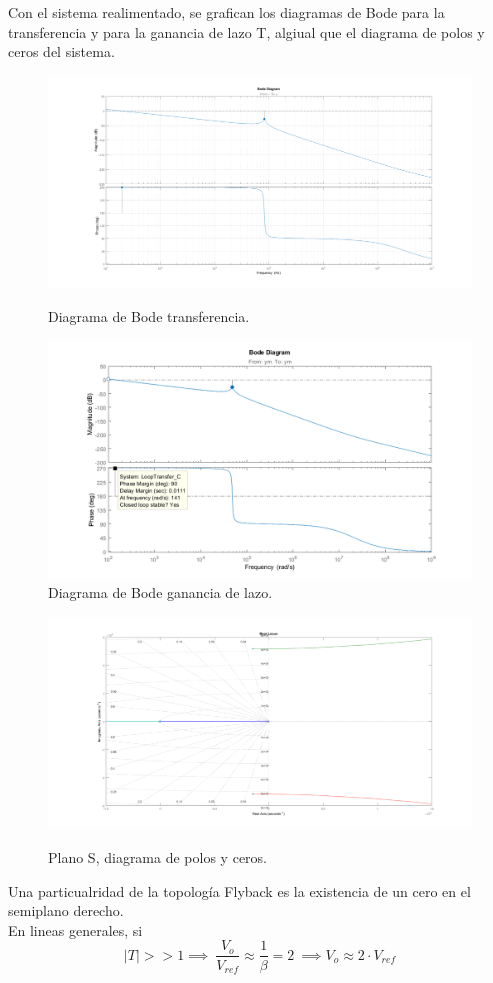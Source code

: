 Con el sistema realimentado, se grafican los diagramas de Bode para la transferencia y para la ganancia de lazo T, algiual que el diagrama de polos y ceros del sistema.
\begin{figure}[H]
	\centering
	\includegraphics[width=0.8\linewidth]{ImagenesParteIII/Bode.png}
	\label{fig:bode}
	\caption{Diagrama de Bode transferencia.}
\end{figure}
\begin{figure}[H]
	\centering
	\includegraphics[width=0.8\linewidth]{ImagenesParteIII/BodeT.png}
	\caption{Diagrama de Bode ganancia de lazo.}
	\label{fig:bodeT}
\end{figure}

\begin{figure}[H]
	\centering
	\includegraphics[width=0.8\linewidth]{ImagenesParteIII/Rlocus.png}
	\label{fig:zplane}
	\caption{Plano S, diagrama de polos y ceros.}
\end{figure}
Una particualridad de la topología Flyback es la existencia de un cero en el semiplano derecho.\\
En lineas generales, si 
\begin{equation}
|T| >> 1 \implies \ \frac{V_o}{V_{ref}} \approx \frac{1}{\beta} = 2 \ \implies V_o\approx 2\cdot V_{ref} 
\end{equation}

